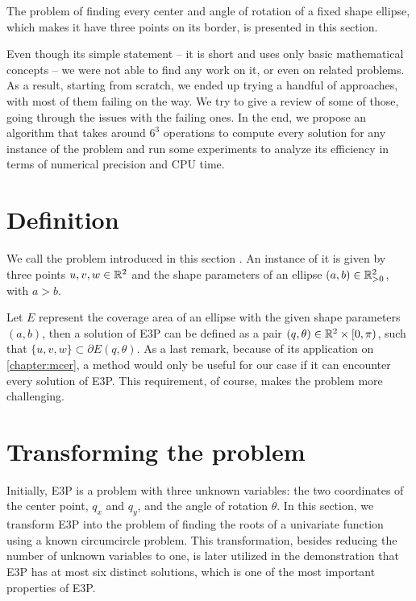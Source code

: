 The problem of finding every center and angle of rotation of a fixed shape ellipse, which makes it have three points on its border, is presented in this section. 

Even though its simple statement -- it is short and uses only basic mathematical concepts -- we were not able to find any work on it, or even on related problems.
As a result, starting from scratch, we ended up trying a handful of approaches, with most of them failing on the way. We try to give a review of some of those, going through the issues with the failing ones. In the end, we propose an algorithm that takes around $6^3$ operations to compute every solution for any instance of the problem and run some experiments to analyze its efficiency in terms of numerical precision and CPU time.

\section{Definition}

We call the problem introduced in this section . An instance of it is given by three points $u, v, w \in \mathbb{R}^2$ and the shape parameters of an ellipse $(a, b) \in \mathbb{R}^2_{>0}$, with $a > b$. 

Let $E$ represent the coverage area of an ellipse with the given shape parameters $(a, b)$, then a solution of E3P can be defined as a pair $(q, \theta) \in \mathbb{R}^2\times[0, \pi)$, such that $\{u, v, w\} \subset \partial E(q, \theta)$. As a last remark, because of its application on \autoref{chapter:mcer}, a method would only be useful for our case if it can encounter every solution of E3P. This requirement, of course, makes the problem more challenging.

\section{Transforming the problem}

Initially, E3P is a problem with three unknown variables: the two coordinates of the center point, $q_x$ and $q_y$, and the angle of rotation $\theta$. In this section, we transform E3P into the problem of finding the roots of a univariate function using a known circumcircle problem. 
This transformation, besides reducing the number of unknown variables to one, is later utilized in the demonstration that E3P has at most six distinct solutions, which is one of the most important properties of E3P.

